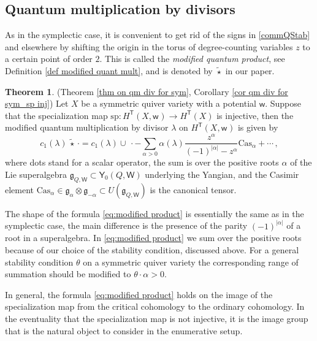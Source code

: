 \documentclass[10pt]{amsart}
\theoremstyle{definition}
\newtheorem{Theorem}{Theorem}[section]
\numberwithin{equation}{section}
\newcommand{\fg}{\mathfrak{g}}
\newcommand{\sT}{\mathsf{T}}
\newcommand{\sW}{\mathsf{W}}
\newcommand{\sw}{\mathsf{w}}
\begin{document}
\subsection{Quantum multiplication by divisors}

As in the symplectic case, it is convenient to get rid of the signs in
\eqref{commQStab} and elsewhere by shifting the origin in the
torus of degree-counting variables $z$
to a certain point of order $2$. This is called the
\textit{modified quantum product}, see Definition \ref{def modified quant mult}, and is denoted
by $\widetilde{\star}$ in our paper.

\begin{Theorem}(Theorem \ref{thm on qm div for sym}, Corollary \ref{cor qm div for sym_sp inj})
Let $X$ be a symmetric quiver variety with a potential $\sw$. 
Suppose that the specialization map $\mathrm{sp}\colon H^\sT(X,\sw^{})\to H^\sT(X)$ is injective, then the modified quantum multiplication by divisor $\lambda$ on 
$H^\sT(X,\sw^{})$ is given by
\begin{equation}
c_1(\lambda)\,\widetilde{\star}\,\cdot  =c_1(\lambda)\cup\,\cdot 
-\sum_{\alpha>0}\alpha(\lambda)\frac{z^\alpha}{(-1)^{|\alpha|}-z^\alpha}\mathrm{Cas}_\alpha+\cdots
\,,\label{eq:modified product}
\end{equation}
where dots stand for a scalar operator, 
the sum is over the positive roots $\alpha$ of the Lie superalgebra
$\mathfrak{g}_{Q,\sW} \subset \mathsf Y_0(Q,\sW)$ underlying the Yangian, and
the Casimir element 
$\mathrm{Cas}_\alpha \in \fg_\alpha \otimes \fg_{-\alpha} \subset
U(\mathfrak{g}_{Q,\sW})$ is the canonical tensor.

\end{Theorem}


The shape of the 
formula \eqref{eq:modified product} is essentially the same as in the
symplectic case, the main difference is the presence of the parity
$(-1)^{|\alpha|}$ of a root in a superalgebra. In \eqref{eq:modified
  product} we sum over the positive roots because of our choice of
the stability condition, discussed above. For a general
stability condition $\theta$ on a symmetric quiver variety the
corresponding range of summation should be modified to
$\theta \cdot \alpha > 0$. 

In general, the formula \eqref{eq:modified product} holds on the
image of the specialization map from the critical cohomology to
the ordinary cohomology. In the eventuality that the specialization
map is not injective, it is the image group that is the natural
object to consider in the enumerative setup.
\end{document}
